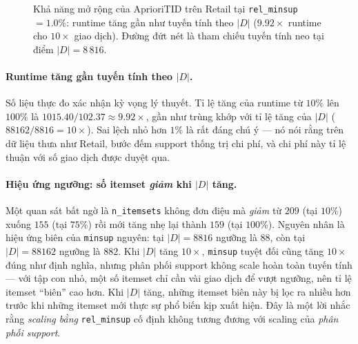 \begin{figure}[htbp]
    \centering
    \caption{Khả năng mở rộng của AprioriTID trên Retail tại \texttt{rel\_minsup}$=1.0\%$: runtime tăng gần như tuyến tính theo $|D|$ ($9.92\times$ runtime cho $10\times$ giao dịch). Đường đứt nét là tham chiếu tuyến tính neo tại điểm $|D|=8\,816$.}
    \label{fig:exp-e-scalability}
\end{figure}

\paragraph{Runtime tăng gần tuyến tính theo $|D|$.} Số liệu thực đo xác nhận kỳ vọng lý thuyết. Tỉ lệ tăng của runtime từ $10\%$ lên $100\%$ là $1015.40 / 102.37 \approx 9.92\times$, gần như trùng khớp với tỉ lệ tăng của $|D|$ ($88162 / 8816 = 10\times$). Sai lệch nhỏ hơn $1\%$ là rất đáng chú ý --- nó nói rằng trên dữ liệu thưa như Retail, bước đếm support thống trị chi phí, và chi phí này tỉ lệ thuận với số giao dịch được duyệt qua.

\paragraph{Hiệu ứng ngưỡng: số itemset \emph{giảm} khi $|D|$ tăng.} Một quan sát bất ngờ là \texttt{n\_itemsets} không đơn điệu mà \emph{giảm} từ $209$ (tại $10\%$) xuống $155$ (tại $75\%$) rồi mới tăng nhẹ lại thành $159$ (tại $100\%$). Nguyên nhân là hiệu ứng biên của \texttt{minsup} nguyên: tại $|D|=8816$ ngưỡng là $88$, còn tại $|D|=88162$ ngưỡng là $882$. Khi $|D|$ tăng $10\times$, \texttt{minsup} tuyệt đối cũng tăng $10\times$ đúng như định nghĩa, nhưng phân phối support không scale hoàn toàn tuyến tính --- với tập con nhỏ, một số itemset chỉ cần vài giao dịch để vượt ngưỡng, nên tỉ lệ itemset ``biên'' cao hơn. Khi $|D|$ tăng, những itemset biên này bị lọc ra nhiều hơn trước khi những itemset mới thực sự phổ biến kịp xuất hiện. Đây là một lời nhắc rằng \emph{scaling bằng }\texttt{rel\_minsup} cố định không tương đương với scaling của \emph{phân phối support}.

